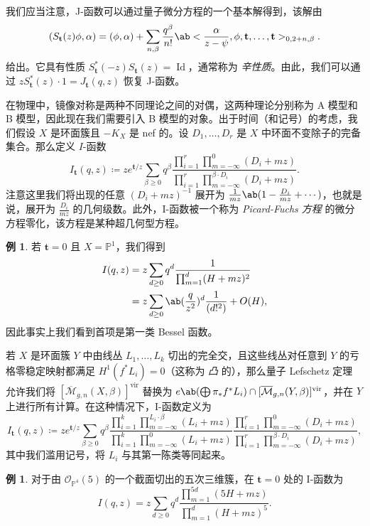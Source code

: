 \documentclass{amsart}
\theoremstyle{definition}
\newtheorem{exm}[thm]{例}
\theoremstyle{remark}
\theoremstyle{plain}
\theoremstyle{definition}
\theoremstyle{remark}
\renewcommand{\P}{\mathbb{P}}
\newcommand{\Mbar}{\overline{\mathcal{M}}}
\newcommand{\mc}[1]{\mathcal{#1}}
\newcommand{\mbf}[1]{\mathbf{#1}}
\newcommand{\mr}[1]{\mathrm{#1}}
\newcommand{\on}[1]{\operatorname{#1}}
\newcommand{\1}{\mathbf{1}}
\newcommand{\2}{\mathbf{2}}
\newcommand{\3}{\mathbf{3}}
\newcommand{\vir}{\mr{vir}}
\begin{document}
我们应当注意，J-函数可以通过量子微分方程的一个基本解得到，该解由
\[ ( S_{\mbf{t}}(z) \phi , \alpha) = (\phi, \alpha) + \sum_{n, \beta} \frac{q^{\beta}}{n!} \ab<\frac{\alpha}{z-\psi}, \phi, \mbf{t}, \ldots, \mbf{t}>_{0, 2+n, \beta}. \]
给出。它具有性质 \(S_{\mbf{t}}^*(-z) S_{\mbf{t}}(z) = \on{Id}\)，通常称为 \textit{辛性质}。由此，我们可以通过 \(z S_{\mbf{t}}^*(z)\cdot 1 = J_{\mbf{t}}(q, z)\) 恢复 J-函数。

在物理中，镜像对称是两种不同理论之间的对偶，这两种理论分别称为 A 模型和 B 模型，因此现在我们需要引入 B 模型的对象。出于时间（和记号）的考虑，我们假设 \(X\) 是环面簇且 \(-K_X\) 是 nef 的。设 \(D_1, \ldots, D_r\) 是 \(X\) 中环面不变除子的完备集合。那么定义 \(I\)-函数
\[
    I_{\mbf{t}}(q, z) \coloneqq z e^{\mbf{t}/z} \sum_{\beta \geq 0} q^{\beta} \frac{\prod_{i=1}^r \prod_{m = -\infty}^{0} (D_i + mz)}{\prod_{i=1}^r \prod_{m=-\infty}^{\beta \cdot D_i} (D_i + mz)}.
\]
注意这里我们将出现的任意 \((D_i + mz)^{-1}\) 展开为 \(\frac{1}{mz} \ab(1 - \frac{D_i}{mz} + \cdots)\)，也就是说，展开为 \(\frac{D_i}{mz}\) 的几何级数。此外，I-函数被一个称为 \textit{Picard-Fuchs 方程} 的微分方程零化，该方程是某种超几何型方程。

\begin{exm}
    若 \(\mbf{t} = 0\) 且 \(X = \P^1\)，我们得到
    \begin{align*}
        I(q,z) &= z\sum_{d \geq 0} q^d \frac{1}{\prod_{m=1}^d (H + mz)^2} \\
        &= z\sum_{d \geq 0} \ab(\frac{q}{z^2})^d \frac{1}{(d!^2)} + O(H),
    \end{align*}
    因此事实上我们看到首项是第一类 Bessel 函数。
\end{exm}

若 \(X\) 是环面簇 \(Y\) 中由线丛 \(L_1, \ldots, L_k\) 切出的完全交，且这些线丛对任意到 \(Y\) 的亏格零稳定映射都满足 \(H^1(f^* L_i) = 0\)（这称为 \textit{凸} 的），那么量子 Lefschetz 定理~\cite{CoatesGivental2007} 允许我们将 \([\Mbar_{g,n}(X, \beta)]^{\vir}\) 替换为 \(e\ab(\bigoplus \pi_* f^* L_i) \cap [\Mbar_{g,n}(Y, \beta)]^{\vir}\)，并在 \(Y\) 上进行所有计算。在这种情况下，I-函数定义为
\[
    I_{\mbf{t}}(q,z) \coloneqq z e^{\mbf{t}/z} \sum_{\beta \geq 0} q^{\beta} \frac{\prod_{i=1}^k \prod_{m=-\infty}^{L_i \cdot \beta} (L_i + mz)}{\prod_{i=1}^k \prod_{m=-\infty}^{0} (L_i + mz)} \frac{\prod_{i=1}^r \prod_{m = -\infty}^{0} (D_i + mz)}{\prod_{i=1}^r \prod_{m=-\infty}^{\beta \cdot D_i} (D_i + mz)},
\]
其中我们滥用记号，将 \(L_i\) 与其第一陈类等同起来。

\begin{exm}
    对于由 \(\mc{O}_{\P^4}(5)\) 的一个截面切出的五次三维簇，在 \(\mbf{t} = 0\) 处的 I-函数为
    \[ I(q,z) = z \sum_{d \geq 0} q^d \frac{\prod_{m=1}^{5d}(5H+mz)}{\prod_{m=1}^d (H+mz)^5}. \]
\end{exm}
\end{document}
